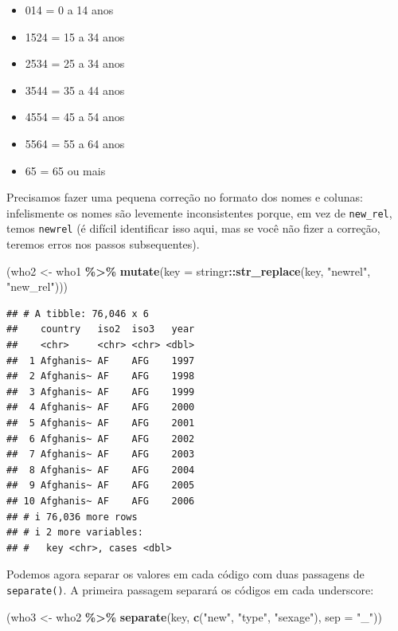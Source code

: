 \documentclass[
]{latex/krantz}
\newenvironment{Shaded}{\begin{snugshade}}{\end{snugshade}}
\newcommand{\AttributeTok}[1]{\textcolor[rgb]{0.13,0.29,0.53}{#1}}
\newcommand{\FunctionTok}[1]{\textcolor[rgb]{0.13,0.29,0.53}{\textbf{#1}}}
\newcommand{\NormalTok}[1]{#1}
\newcommand{\OtherTok}[1]{\textcolor[rgb]{0.56,0.35,0.01}{#1}}
\newcommand{\SpecialCharTok}[1]{\textcolor[rgb]{0.81,0.36,0.00}{\textbf{#1}}}
\newcommand{\StringTok}[1]{\textcolor[rgb]{0.31,0.60,0.02}{#1}}
\providecommand{\tightlist}{%
  \setlength{\itemsep}{0pt}\setlength{\parskip}{0pt}}
\theoremstyle{definition}
\theoremstyle{definition}
\theoremstyle{definition}
\theoremstyle{definition}
\theoremstyle{remark}
\begin{document}
\begin{itemize}
\tightlist
\item
  014 = 0 a 14 anos
\item
  1524 = 15 a 34 anos
\item
  2534 = 25 a 34 anos
\item
  3544 = 35 a 44 anos
\item
  4554 = 45 a 54 anos
\item
  5564 = 55 a 64 anos
\item
  65 = 65 ou mais
\end{itemize}

Precisamos fazer uma pequena correção no formato dos nomes e colunas: infelismente os nomes são levemente inconsistentes porque, em vez de \texttt{new\_rel}, temos \texttt{newrel} (é difícil identificar isso aqui, mas se você não fizer a correção, teremos erros nos passos subsequentes).

\begin{Shaded}
\begin{Highlighting}[]
\NormalTok{(who2 }\OtherTok{\textless{}{-}}\NormalTok{ who1 }\SpecialCharTok{\%\textgreater{}\%}
  \FunctionTok{mutate}\NormalTok{(}\AttributeTok{key =}\NormalTok{ stringr}\SpecialCharTok{::}\FunctionTok{str\_replace}\NormalTok{(key, }\StringTok{"newrel"}\NormalTok{, }\StringTok{"new\_rel"}\NormalTok{)))}
\end{Highlighting}
\end{Shaded}

\begin{verbatim}
## # A tibble: 76,046 x 6
##    country   iso2  iso3   year
##    <chr>     <chr> <chr> <dbl>
##  1 Afghanis~ AF    AFG    1997
##  2 Afghanis~ AF    AFG    1998
##  3 Afghanis~ AF    AFG    1999
##  4 Afghanis~ AF    AFG    2000
##  5 Afghanis~ AF    AFG    2001
##  6 Afghanis~ AF    AFG    2002
##  7 Afghanis~ AF    AFG    2003
##  8 Afghanis~ AF    AFG    2004
##  9 Afghanis~ AF    AFG    2005
## 10 Afghanis~ AF    AFG    2006
## # i 76,036 more rows
## # i 2 more variables:
## #   key <chr>, cases <dbl>
\end{verbatim}

Podemos agora separar os valores em cada código com duas passagens de \texttt{separate()}. A primeira passagem separará os códigos em cada underscore:

\begin{Shaded}
\begin{Highlighting}[]
\NormalTok{(who3 }\OtherTok{\textless{}{-}}\NormalTok{ who2 }\SpecialCharTok{\%\textgreater{}\%}
   \FunctionTok{separate}\NormalTok{(key, }\FunctionTok{c}\NormalTok{(}\StringTok{"new"}\NormalTok{, }\StringTok{"type"}\NormalTok{, }\StringTok{"sexage"}\NormalTok{), }\AttributeTok{sep =} \StringTok{"\_"}\NormalTok{))}
\end{Highlighting}
\end{Shaded}
\end{document}
